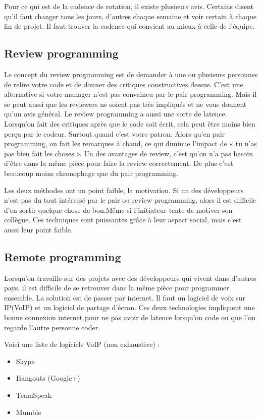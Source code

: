 \documentclass[journal, a4paper, frenchb]{IEEEtran}
\begin{document}
Pour ce qui est de la cadence de rotation, il existe plusieurs avis. Certains disent qu’il faut changer tous les jours, d’autres chaque semaine et voir certain à chaque fin de projet. Il faut trouver la cadence qui convient au mieux à celle de l’équipe.

\subsection{Review programming}

Le concept du review programming est de demander à une ou plusieurs personnes de relire votre code et de donner des critiques constructives dessus. C’est une alternative si votre manager n’est pas convaincu par le pair programming. Mais il se peut aussi que les reviewers ne soient pas très impliqués et ne vous donnent qu’un avis général. Le review programming a aussi une sorte de latence. Lorsqu’on fait des critiques après que le code soit écrit, cela peut être moins bien perçu par le codeur. Surtout quand c’est votre patron. Alors qu’en pair programming, on fait les remarques à chaud, ce qui diminue l’impact de « tu n’as pas bien fait les choses ». Un des avantages de review, c’est qu’on n'a pas besoin d’être dans la même pièce pour faire la review correctement. De plus c'est beaucoup moins chronophage que du pair programming.

Les deux méthodes ont un point faible, la motivation. Si un des développeurs n’est pas du tout intéressé par le pair ou review programming, alors il est difficile d’en sortir quelque chose de bon.Même si l’initiateur tente de motiver son collègue. Ces techniques sont puissantes grâce à leur aspect social, mais c’est aussi leur point faible.

\subsection{Remote programming}

Lorsqu’on travaille sur des projets avec des développeurs qui vivent dans d’autres pays, il est difficile de se retrouver dans la même pièce pour programmer ensemble. La solution est de passer par internet. Il faut un logiciel de voix sur IP(VoIP) et un logiciel de partage d’écran. Ces deux technologies impliquent une bonne connexion internet pour ne pas avoir de latence lorsqu’on code ou que l’on regarde l’autre personne coder.

Voici une liste de logiciels VoIP (non exhaustive) :

\begin{multicols}{2}
\begin{itemize}
    \item Skype
    \item Hangouts (Google+)
    \item TeamSpeak
    \item Mumble
\end{itemize}
\end{multicols}
\end{document}
